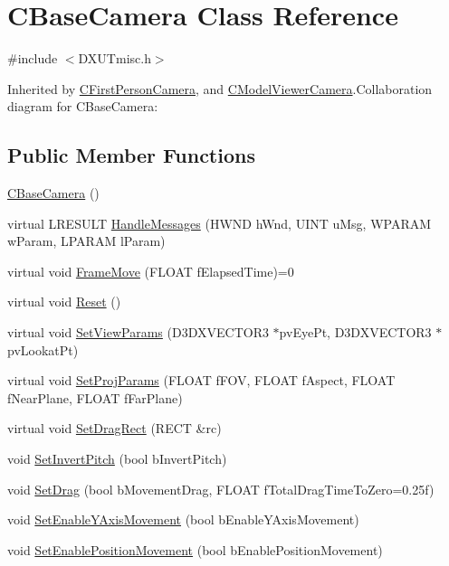 \hypertarget{class_c_base_camera}{
\section{CBaseCamera Class Reference}
\label{class_c_base_camera}
}


{\ttfamily \#include $<$DXUTmisc.h$>$}

Inherited by \hyperlink{class_c_first_person_camera}{CFirstPersonCamera}, and \hyperlink{class_c_model_viewer_camera}{CModelViewerCamera}.Collaboration diagram for CBaseCamera:\subsection*{Public Member Functions}
\begin{DoxyCompactItemize}
\item 
\hyperlink{class_c_base_camera_a4f4eaa45a5d8632abb98b035219e6b82}{CBaseCamera} ()
\item 
virtual LRESULT \hyperlink{class_c_base_camera_a77cc040ed2d0b3479412b81316beb793}{HandleMessages} (HWND hWnd, UINT uMsg, WPARAM wParam, LPARAM lParam)
\item 
virtual void \hyperlink{class_c_base_camera_a21db15a8cdca60d1540d958a32708703}{FrameMove} (FLOAT fElapsedTime)=0
\item 
virtual void \hyperlink{class_c_base_camera_adc95e71e268d59a084f6e8d95a9aadb9}{Reset} ()
\item 
virtual void \hyperlink{class_c_base_camera_a17b45dd3b6055bc761058d57f5a10c02}{SetViewParams} (D3DXVECTOR3 $\ast$pvEyePt, D3DXVECTOR3 $\ast$pvLookatPt)
\item 
virtual void \hyperlink{class_c_base_camera_a08cfa8a4246cd6115e6522821e573e89}{SetProjParams} (FLOAT fFOV, FLOAT fAspect, FLOAT fNearPlane, FLOAT fFarPlane)
\item 
virtual void \hyperlink{class_c_base_camera_a8c425184f1114f17bb8e1b3505c13036}{SetDragRect} (RECT \&rc)
\item 
void \hyperlink{class_c_base_camera_ad76b241a4bf9ef386563fd1a38ef70ae}{SetInvertPitch} (bool bInvertPitch)
\item 
void \hyperlink{class_c_base_camera_a029f5a9a3e3555c94e8b88783a9d51f3}{SetDrag} (bool bMovementDrag, FLOAT fTotalDragTimeToZero=0.25f)
\item 
void \hyperlink{class_c_base_camera_a5eb76cd5ca8ee2b377cf7434ee718547}{SetEnableYAxisMovement} (bool bEnableYAxisMovement)
\item 
void \hyperlink{class_c_base_camera_a6f65efa814bda8435fb45cca7f9c1f32}{SetEnablePositionMovement} (bool bEnablePositionMovement)

\end{DoxyCompactItemize}
